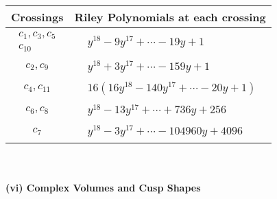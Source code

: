 \documentclass[1p]{elsarticle_modified}
\theoremstyle{definition}
\begin{document}
\begin{tabular}{m{50pt}|m{274pt}}
Crossings & \hspace{64pt}Riley Polynomials at each crossing \\
\hline $$\begin{aligned}c_{1},c_{3},c_{5}\\c_{10}\end{aligned}$$&$\begin{aligned}
&y^{18}-9 y^{17}+\cdots-19 y+1
\end{aligned}$\\
\hline $$\begin{aligned}c_{2},c_{9}\end{aligned}$$&$\begin{aligned}
&y^{18}+3 y^{17}+\cdots-159 y+1
\end{aligned}$\\
\hline $$\begin{aligned}c_{4},c_{11}\end{aligned}$$&$\begin{aligned}
&16(16 y^{18}-140 y^{17}+\cdots-20 y+1)
\end{aligned}$\\
\hline $$\begin{aligned}c_{6},c_{8}\end{aligned}$$&$\begin{aligned}
&y^{18}-13 y^{17}+\cdots+736 y+256
\end{aligned}$\\
\hline $$\begin{aligned}c_{7}\end{aligned}$$&$\begin{aligned}
&y^{18}-3 y^{17}+\cdots-104960 y+4096
\end{aligned}$\\
\hline
\end{tabular}\\~\\
\newpage\flushleft \textbf{(vi) Complex Volumes and Cusp Shapes}
\end{document}

